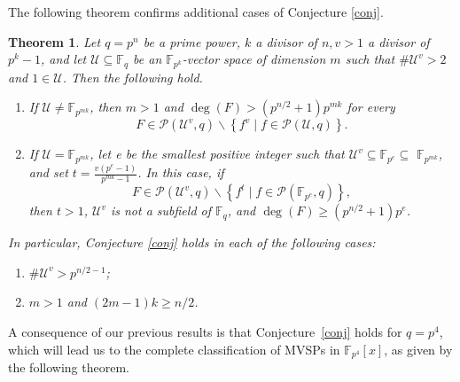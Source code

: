 \documentclass[11pt]{amsart}
\newtheorem{theorem}{Theorem}[section]
\theoremstyle{definition}
\theoremstyle{remark}
\begin{document}
The following theorem confirms additional  cases of Conjecture \ref{conj}.



\begin{theorem}\label{pre-conj}  Let $q=p^n$ be a prime power, $k$ a divisor of $n, v>1$  a divisor of $p^k-1$, and let $\mathcal{U} \subseteq \mathbb{F}_q$ be an $\mathbb{F}_{p^k}$-vector space of dimension $m$ such that $\# \mathcal{U}^v>2$ and $1 \in \mathcal{U}$. Then the following hold.
\begin{enumerate}[\rm(i)]
\item If $\mathcal{U} \neq \mathbb{F}_{p^{m k}}$, then $m>1$ and $\operatorname{deg}(F)>\left(p^{n / 2}+1\right) p^{m k}$ for every
$$
F \in \mathcal{P}\left(\mathcal{U}^v, q\right) \backslash\left\{f^v \mid f \in \mathcal{P}(\mathcal{U}, q)\right\} .
$$
\item  If $\mathcal{U}=\mathbb{F}_{p^{m k}}$, let e be the smallest positive integer such that $\mathcal{U}^v \subseteq \mathbb{F}_{p^e} \subseteq$ $\mathbb{F}_{p^{m k}}$, and set $t=\frac{v\left(p^e-1\right)}{p^{m k}-1} $. In this case, if
$$
F \in \mathcal{P}\left(\mathcal{U}^v, q\right) \backslash\left\{f^t \mid f \in \mathcal{P}\left(\mathbb{F}_{p^e}, q\right)\right\},
$$
then $t>1$, $\mathcal{U}^v$ is not a subfield of $\mathbb{F}_q$, and $\operatorname{deg}(F) \geq\left(p^{n / 2}+1\right) p^e$.
 \end{enumerate}
In particular, Conjecture  \ref{conj} holds in each of the following cases:
\begin{enumerate}[\rm(a)]
\item $\# \mathcal{U}^v>p^{n / 2-1}$;
\item  $m>1$ and $(2 m-1) k \geq n / 2$.

 \end{enumerate}

\end{theorem}



A consequence of our previous results is that  Conjecture~\ref{conj} holds for $q=p^4$, which will lead us to the complete classification of MVSPs in $\mathbb{F}_{p^4}[x]$, as given by the following theorem.
\end{document}
